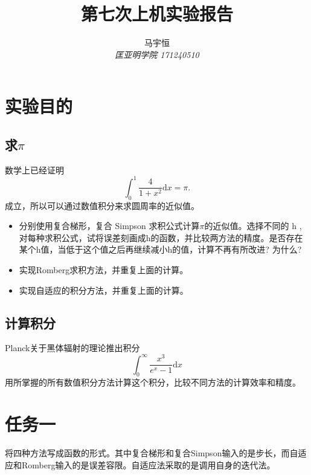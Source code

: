 \documentclass[a4paper,11pt,onecolumn,twoside]{article}
\title{\textbf{第七次上机实验报告}}
\author{
马宇恒
\\[2pt]
{\small \textit{匡亚明学院 171240510}}}
\date{}
\begin{document}
\maketitle
\thispagestyle{firststyle}
\setlength{\oddsidemargin}{ 1cm}
\setlength{\evensidemargin}{\oddsidemargin}
\setlength{\textwidth}{15.50cm}
\vspace{-.8cm}


\setcounter{page}{1}

\setlength{\oddsidemargin}{-.5cm}  %
\setlength{\evensidemargin}{\oddsidemargin}
\setlength{\textwidth}{17.00cm}

\section{实验目的}
\subsection{求$\pi$}
数学上已经证明$$\int _ { 0 } ^ { 1 } \frac { 4 } { 1 + x ^ { 2 } } \mathrm { d } x = \pi.$$成立，所以可以通过数值积分来求圆周率的近似值。
\begin{itemize}
\item 分别使用复合梯形，复合 Simpson 求积公式计算$\pi$的近似值。选择不同的 h , 对每种求积公式，试将误差刻画成h的函数，并比较两方法的精度。是否存在某个h值，当低于这个值之后再继续减小h的值，计算不再有所改进? 为什么?
\item 实现Romberg求积方法，并重复上面的计算。
\item 实现自适应的积分方法，并重复上面的计算。
\end{itemize}
\subsection{计算积分}
Planck关于黑体辐射的理论推出积分$$\int _ { 0 } ^ { \infty } \frac { x ^ { 3 } } { e ^ { x } - 1 } \mathrm { d } x$$用所掌握的所有数值积分方法计算这个积分，比较不同方法的计算效率和精度。
\section{任务一}
将四种方法写成函数的形式。其中复合梯形和复合Simpson输入的是步长，而自适应和Romberg输入的是误差容限。自适应法采取的是调用自身的迭代法。
\end{document}
